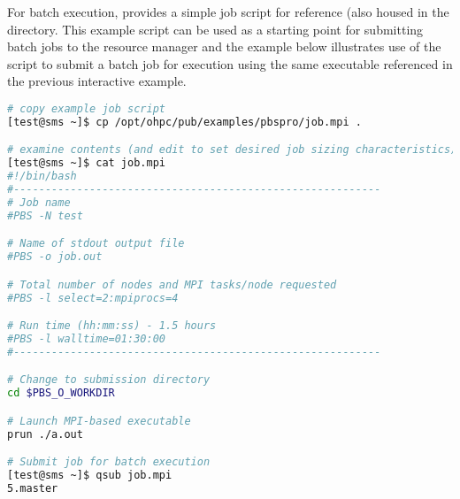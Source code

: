 For batch execution, \OHPC{} provides a simple job script for reference (also
housed in the  directory. This example script can
be used as a starting point for submitting batch jobs to the resource manager
and the example below illustrates use of the script to submit a batch job for
execution using the same executable referenced in the previous interactive
example.

\begin{lstlisting}[language=bash,keywords={}]
# copy example job script
[test@sms ~]$ cp /opt/ohpc/pub/examples/pbspro/job.mpi .

# examine contents (and edit to set desired job sizing characteristics)
[test@sms ~]$ cat job.mpi
#!/bin/bash
#----------------------------------------------------------
# Job name
#PBS -N test

# Name of stdout output file
#PBS -o job.out

# Total number of nodes and MPI tasks/node requested
#PBS -l select=2:mpiprocs=4

# Run time (hh:mm:ss) - 1.5 hours
#PBS -l walltime=01:30:00
#----------------------------------------------------------

# Change to submission directory
cd $PBS_O_WORKDIR

# Launch MPI-based executable
prun ./a.out

# Submit job for batch execution
[test@sms ~]$ qsub job.mpi
5.master

\end{lstlisting}

